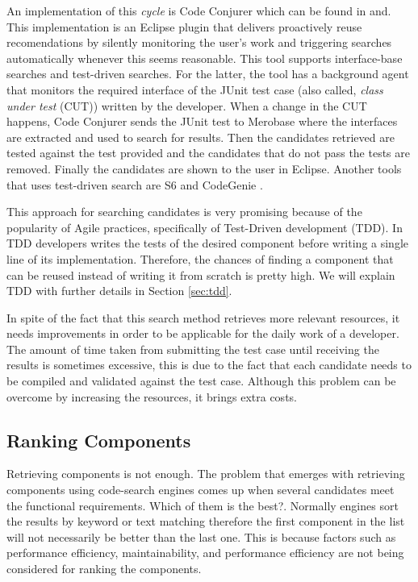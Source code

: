 An implementation of this \textit{cycle} is Code Conjurer which can be found in \cite{Hummel2008} and\cite{Hummel2013}. This implementation is an Eclipse plugin that delivers proactively reuse recomendations by silently monitoring the user's work and triggering searches automatically whenever this seems reasonable. This tool supports interface-base searches and test-driven searches. For the latter, the tool has a background agent that monitors the required interface of the JUnit test case (also called, \textit{class under test} (CUT)) written by the developer. When a change in the CUT happens, Code Conjurer sends the JUnit test to Merobase where the interfaces are extracted and used to search for results. Then the candidates retrieved are tested against the test provided and the candidates that do not pass the tests are removed. Finally the candidates are shown to the user in Eclipse. Another tools that uses test-driven search are S6 \cite{Reiss2009} and CodeGenie \cite{Lemos2007}.

This approach for searching candidates is very promising because of the popularity of Agile practices, specifically of Test-Driven development (TDD)\cite{Beck2003}. In TDD developers writes the tests of the desired component before writing a single line of its implementation. Therefore, the chances of finding a component that can be reused instead of writing it from scratch is pretty high. We will explain TDD with further details in Section \ref{sec:tdd}.

In spite of the fact that this search method retrieves more relevant resources, it needs improvements in order to be applicable for the daily work of a developer. The amount of time taken from submitting the test case until receiving the results is sometimes excessive, this is due to the fact that each candidate needs to be compiled and validated against the test case. Although this problem can be overcome by increasing the resources, it brings extra costs. 

\subsection{Ranking Components}
Retrieving components is not enough. The problem that emerges with retrieving components using code-search engines comes up when several candidates meet the functional requirements. Which of them is the best?. Normally engines sort the results by keyword or text matching therefore the first component in the list will not necessarily be better than the last one. This is because factors such as performance efficiency, maintainability, and performance efficiency are not being considered for ranking the components.

